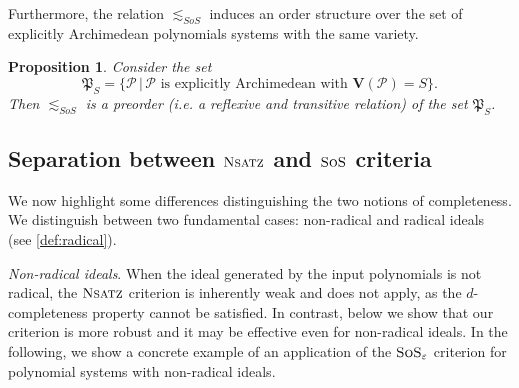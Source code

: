 \documentclass[11pt]{article}
\newcommand{\sos}{\text{\sc{SoS}}}
\newcommand{\Nsatz}{\textsc{Nsatz}}
\newcommand{\Variety}[1]{{\textbf{V}}\left( #1 \right)}
\newcommand{\1}{\textbf{1}}
\newtheorem{proposition}[theorem]{Proposition}
\begin{document}
Furthermore, the relation $\lesssim_{SoS}$ induces an order structure over the set of explicitly Archimedean polynomials systems with the same variety.

\begin{proposition}
    Consider the set
    \begin{equation*}
        \mathfrak{P}_{S} = \{ \mathcal{P} \, | \, \text{$\mathcal{P}$ is explicitly Archimedean with $\Variety{\mathcal{P}} = S$}\}.
    \end{equation*}
    Then $\lesssim_{SoS}$ is a \emph{preorder} (i.e. a reflexive and transitive relation) of the set $\mathfrak{P}_S$.
\end{proposition}

\subsection[Separation between Nsatz and SoS]{Separation between $\Nsatz$ and $\sos$ criteria}\label{sect:separation_Nsatz_SOS}

We now highlight some differences distinguishing the two notions of completeness. We distinguish between two fundamental cases: non-radical and radical ideals (see \cref{def:radical}).

\textit{Non-radical ideals}. When the ideal generated by the input polynomials is not radical, the $\Nsatz$ criterion is inherently weak and does not apply, as the $d$-completeness property cannot be satisfied. In contrast, below we show that our criterion is more robust and it may be effective even for non-radical ideals. 
%
In the following, we show a concrete example of an application of the $\sos_{\varepsilon}$ criterion for polynomial systems with non-radical ideals.
\end{document}
